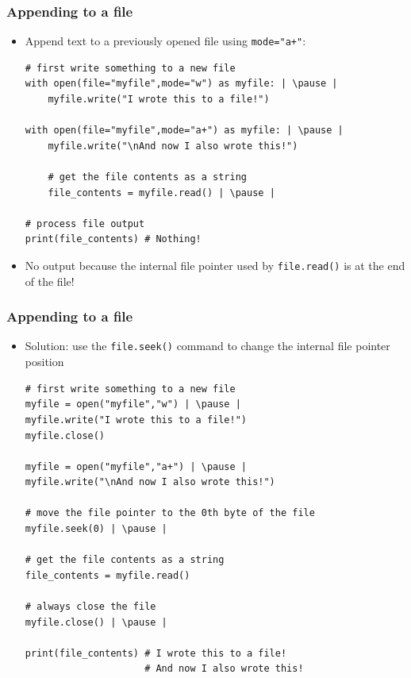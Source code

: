 \documentclass[xcolor=table]{beamer}
\begin{document}
\begin{frame}[fragile]
    \frametitle{Appending to a file}
\begin{itemize}
    \item Append text to a previously opened file using \texttt{mode="a+"}: 
\begin{lstlisting}[style=python]
# first write something to a new file
with open(file="myfile",mode="w") as myfile: | \pause |
    myfile.write("I wrote this to a file!")

with open(file="myfile",mode="a+") as myfile: | \pause |
    myfile.write("\nAnd now I also wrote this!")

    # get the file contents as a string
    file_contents = myfile.read() | \pause |

# process file output
print(file_contents) # Nothing!
\end{lstlisting} \pause 
    \item No output because the internal file pointer used by \texttt{file.read()} is at the end of the file!
\end{itemize}
\end{frame}

\begin{frame}[fragile]
    \frametitle{Appending to a file}
\begin{itemize}
    \item Solution: use the \texttt{file.seek()} command to change the internal file pointer position \pause 
\begin{lstlisting}[style=python]
# first write something to a new file
myfile = open("myfile","w") | \pause |
myfile.write("I wrote this to a file!")
myfile.close()

myfile = open("myfile","a+") | \pause |
myfile.write("\nAnd now I also wrote this!")

# move the file pointer to the 0th byte of the file
myfile.seek(0) | \pause |

# get the file contents as a string
file_contents = myfile.read() 

# always close the file
myfile.close() | \pause |

print(file_contents) # I wrote this to a file!
                     # And now I also wrote this!
\end{lstlisting} \pause 
\end{itemize}
\end{frame}

\end{document}
